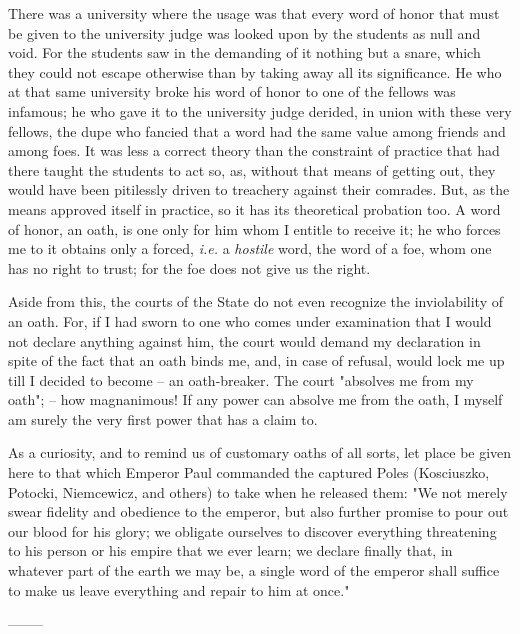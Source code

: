 There was a university where the usage was that every word of honor that must 
be given to the university judge was looked upon by the students as null and 
void. For the students saw in the demanding of it nothing but a snare, which 
they could not escape otherwise than by taking away all its significance. He 
who at that same university broke his word of honor to one of the fellows was 
infamous; he who gave it to the university judge derided, in union with these 
very fellows, the dupe who fancied that a word had the same value among 
friends and among foes. It was less a correct theory than the constraint of 
practice that had there taught the students to act so, as, without that means 
of getting out, they would have been pitilessly driven to treachery against 
their comrades. But, as the means approved itself in practice, so it has its 
theoretical probation too. A word of honor, an oath, is one only for him whom 
I entitle to receive it; he who forces me to it obtains only a forced, 
\textit{i.e.} a \textit{hostile} word, the word of a foe, whom one has no 
right to trust; for the foe does not give us the right.

Aside from this, the courts of the State do not even recognize the 
inviolability of an oath. For, if I had sworn to one who comes under 
examination that I would not declare anything against him, the court would 
demand my declaration in spite of the fact that an oath binds me, and, in case 
of refusal, would lock me up till I decided to become -- an oath-breaker. The 
court "{}absolves me from my oath"{}; -- how magnanimous! If any power can 
absolve me from the oath, I myself am surely the very first power that has a 
claim to.

As a curiosity, and to remind us of customary oaths of all sorts, let place be 
given here to that which Emperor Paul commanded the captured Poles 
(Kosciuszko, Potocki, Niemcewicz, and others) to take when he released them: 
"{}We not merely swear fidelity and obedience to the emperor, but also further 
promise to pour out our blood for his glory; we obligate ourselves to discover 
everything threatening to his person or his empire that we ever learn; we 
declare finally that, in whatever part of the earth we may be, a single word 
of the emperor shall suffice to make us leave everything and repair to him at 
once."{}

\begin{center}
--------\end{center}


